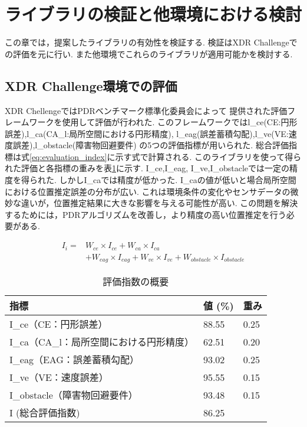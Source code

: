 
\section{ライブラリの検証と他環境における検討}
この章では，提案したライブラリの有効性を検証する.
検証はXDR Challengeでの評価を元に行い.
また他環境でこれらのライブラリが適用可能かを検討する.

\subsection{XDR Challenge環境での評価}
XDR ChellengeではPDRベンチマーク標準化委員会によって
提供された評価フレームワークを使用して評価が行われた.
このフレームワークではl\_ce(CE:円形誤差),l\_ca(CA\_l:局所空間における円形精度),
l\_eag(誤差蓄積勾配),l\_ve(VE:速度誤差),l\_obstacle(障害物回避要件)
の5つの評価指標が用いられた.
総合評価指標は式\ref{eq:evaluation_index}に示す式で計算される.
このライブラリを使って得られた評価と各指標の重みを表\ref{table:evaluation_index}に示す.
I\_ce,I\_eag, I\_ve,I\_obstacleでは一定の精度を得られた.
しかしI\_caでは精度が低かった.
I\_caの値が低いと場合局所空間における位置推定誤差の分布が広い.
これは環境条件の変化やセンサデータの微妙な違いが，位置推定結果に大きな影響を与える可能性が高い.
この問題を解決するためには，PDRアルゴリズムを改善し，より精度の高い位置推定を行う必要がある.

\begin{equation}
	\begin{aligned}
		I_i = & W_{ce} \times I_{ce} + W_{ca} \times I_{ca}                                        \\
		      & + W_{eag} \times I_{eag} + W_{ve} \times I_{ve} + W_{obstacle} \times I_{obstacle}
	\end{aligned}
	\label{eq:evaluation_index}
\end{equation}

\begin{table}[ht]
	\centering
	\begin{tabular}{l|l|l}
		\hline
		指標                        & 値 (\%) & 重み   \\ \hline
		I\_ce（CE：円形誤差）            & 88.55  & 0.25 \\
		I\_ca（CA\_l：局所空間における円形精度） & 62.51  & 0.20 \\
		I\_eag（EAG：誤差蓄積勾配）        & 93.02  & 0.25 \\
		I\_ve（VE：速度誤差）            & 95.55  & 0.15 \\
		I\_obstacle（障害物回避要件）      & 93.48  & 0.15 \\
		I (総合評価指数)                & 86.25  &      \\ \hline
	\end{tabular}
	\caption{評価指数の概要}
	\label{table:evaluation_index}
\end{table}

